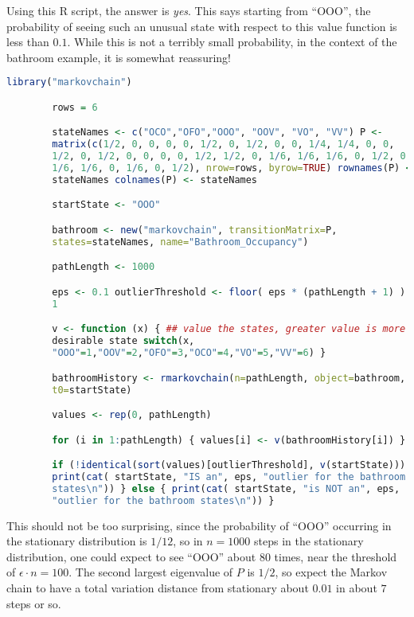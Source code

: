 \documentclass[12pt]{article}
\begin{document}
\begin{solution}
    Using this R script, the answer is \emph{yes}.  This says starting
    from ``OOO'', the probability of seeing such an unusual state with
    respect to this value function is less than \( 0.1 \).  While this
    is not a terribly small probability, in the context of the bathroom
    example, it is somewhat reassuring!

\begin{lstlisting}[language=R]
        library("markovchain")

        rows = 6

        stateNames <- c("OCO","OFO","OOO", "OOV", "VO", "VV") P <-
        matrix(c(1/2, 0, 0, 0, 0, 1/2, 0, 1/2, 0, 0, 1/4, 1/4, 0, 0,
        1/2, 0, 1/2, 0, 0, 0, 0, 1/2, 1/2, 0, 1/6, 1/6, 1/6, 0, 1/2, 0,
        1/6, 1/6, 0, 1/6, 0, 1/2), nrow=rows, byrow=TRUE) rownames(P) <-
        stateNames colnames(P) <- stateNames

        startState <- "OOO"

        bathroom <- new("markovchain", transitionMatrix=P,
        states=stateNames, name="Bathroom_Occupancy")

        pathLength <- 1000

        eps <- 0.1 outlierThreshold <- floor( eps * (pathLength + 1) ) +
        1

        v <- function (x) { ## value the states, greater value is more
        desirable state switch(x,
        "OOO"=1,"OOV"=2,"OFO"=3,"OCO"=4,"VO"=5,"VV"=6) }

        bathroomHistory <- rmarkovchain(n=pathLength, object=bathroom,
        t0=startState)

        values <- rep(0, pathLength)

        for (i in 1:pathLength) { values[i] <- v(bathroomHistory[i]) }

        if (!identical(sort(values)[outlierThreshold], v(startState))) {%
        print(cat( startState, "IS an", eps, "outlier for the bathroom
        states\n")) } else { print(cat( startState, "is NOT an", eps,
        "outlier for the bathroom states\n")) }
\end{lstlisting}

    This should not be too surprising, since the probability of ``OOO''
    occurring in the stationary distribution is \( 1/12 \), so in \(
    n=1000 \) steps in the stationary distribution, one could expect to
    see ``OOO'' about \( 80 \) times, near the threshold of \( \epsilon
    \cdot n = 100 \).  The second largest eigenvalue of \( P \) is \(
    1/2 \), so expect the Markov chain to have a total variation
    distance from stationary about \( 0.01 \) in about \( 7 \) steps or
    so.
\end{solution}
\end{document}
